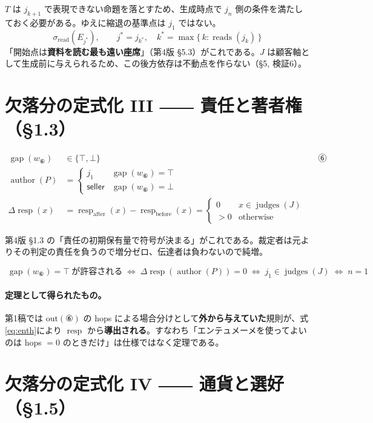 \documentclass[11pt,a4paper]{article}
\newcommand{\gap}{\operatorname{gap}}
\newcommand{\authr}{\operatorname{author}}
\newcommand{\resp}{\operatorname{resp}}
\newcommand{\judges}{\operatorname{judges}}
\newcommand{\reads}{\operatorname{reads}}
\newcommand{\seller}{\mathsf{seller}}
\begin{document}
$T$ は $j_{k+1}$ で表現できない命題を落とすため、生成時点で $j_n$ 側の条件を満たしておく必要がある。ゆえに縮退の基準点は $j_1$ ではない。
\begin{equation}
\sigma_{\mathrm{read}}(E_{j^*}), \qquad j^* = j_{k^*},\quad k^* = \max\{\, k : \reads(j_k) \,\}
\end{equation}
「開始点は\textbf{資料を読む最も遠い座席}」（第4版 \S5.3）がこれである。$J$ は顧客軸として生成前に与えられるため、この後方依存は不動点を作らない（\S5, 検証6）。

\section{欠落分の定式化 III ―― 責任と著者権（§1.3）}

\begin{align}
\gap(w_{⑥}) &\in \{\top,\bot\} && \text{⑥が一寸を残しているか} \\
\authr(P) &= \begin{cases} j_1 & \gap(w_{⑥}) = \top \\ \seller & \gap(w_{⑥}) = \bot \end{cases} \\
\Delta\resp(x) &= \resp_{\text{after}}(x) - \resp_{\text{before}}(x)
= \begin{cases} 0 & x \in \judges(J) \\ >0 & \text{otherwise} \end{cases}
\end{align}

第4版 \S1.3 の「責任の初期保有量で符号が決まる」がこれである。裁定者は元よりその判定の責任を負うので増分ゼロ、伝達者は負わないので純増。

\begin{equation}\label{eq:enth}
\boxed{\;
\gap(w_{⑥}) = \top \ \text{が許容される}
\;\Longleftrightarrow\; \Delta\resp(\authr(P)) = 0
\;\Longleftrightarrow\; j_1 \in \judges(J)
\;\Longleftrightarrow\; n = 1
\;}
\end{equation}

\paragraph{定理として得られたもの。}第1稿では $\mathrm{out}(⑥)$ の hops による場合分けとして\textbf{外から与えていた}規則が、式\eqref{eq:enth}により $\resp$ から\textbf{導出される}。すなわち「エンテュメーメを使ってよいのは hops $=0$ のときだけ」は仕様ではなく定理である。

\section{欠落分の定式化 IV ―― 通貨と選好（§1.5）}
\end{document}

